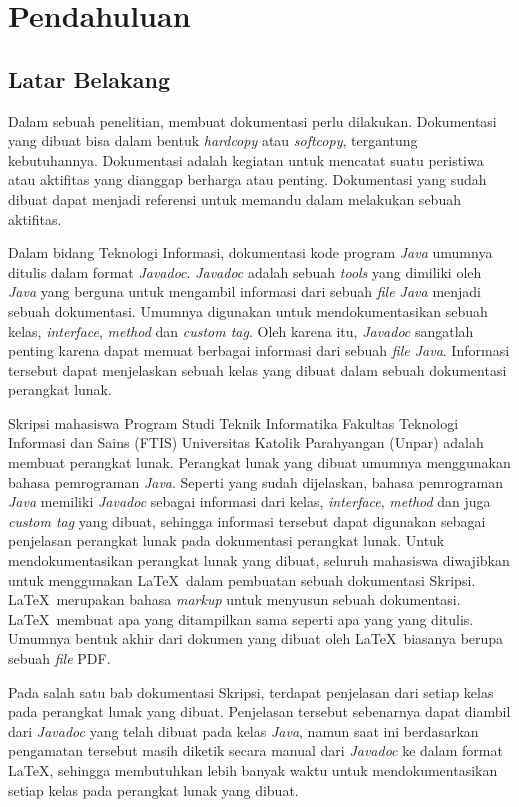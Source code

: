 \chapter{Pendahuluan}
\label{chap:intro}
   
\section{Latar Belakang}
\label{sec:label}

Dalam sebuah penelitian, membuat dokumentasi perlu dilakukan. Dokumentasi yang dibuat bisa dalam bentuk {\it hardcopy} atau {\it softcopy}, tergantung kebutuhannya. Dokumentasi adalah kegiatan untuk mencatat suatu peristiwa atau aktifitas yang dianggap berharga atau penting. Dokumentasi yang sudah dibuat dapat menjadi referensi untuk memandu dalam melakukan sebuah aktifitas.

Dalam bidang Teknologi Informasi, dokumentasi kode program {\it Java} umumnya ditulis dalam format {\it Javadoc}. {\it Javadoc} adalah sebuah {\it tools} yang dimiliki oleh {\it Java} yang berguna untuk mengambil informasi dari sebuah {\it file Java} menjadi sebuah dokumentasi. Umumnya digunakan untuk mendokumentasikan sebuah kelas, {\it interface}, {\it method} dan {\it custom tag}. Oleh karena itu, {\it Javadoc} sangatlah penting karena dapat memuat berbagai informasi dari sebuah {\it file Java}. Informasi tersebut dapat menjelaskan sebuah kelas yang dibuat dalam sebuah dokumentasi perangkat lunak. 

Skripsi mahasiswa Program Studi Teknik Informatika Fakultas Teknologi Informasi dan Sains (FTIS) Universitas Katolik Parahyangan (Unpar) adalah membuat perangkat lunak. Perangkat lunak yang dibuat umumnya menggunakan bahasa pemrograman {\it Java}. Seperti yang sudah dijelaskan, bahasa pemrograman {\it Java} memiliki {\it Javadoc} sebagai informasi dari kelas, {\it interface}, {\it method} dan juga {\it custom tag} yang dibuat, sehingga informasi tersebut dapat digunakan sebagai penjelasan perangkat lunak pada dokumentasi perangkat lunak. Untuk mendokumentasikan perangkat lunak yang dibuat, seluruh mahasiswa diwajibkan untuk menggunakan \LaTeX\ dalam pembuatan sebuah dokumentasi Skripsi. \LaTeX\ merupakan bahasa {\it markup} untuk menyusun sebuah dokumentasi. \LaTeX\ membuat apa yang ditampilkan sama seperti apa yang yang ditulis. Umumnya bentuk akhir dari dokumen yang dibuat oleh \LaTeX\ biasanya berupa sebuah {\it file} PDF.

Pada salah satu bab dokumentasi Skripsi, terdapat penjelasan dari setiap kelas pada perangkat lunak yang dibuat. Penjelasan tersebut sebenarnya dapat diambil dari {\it Javadoc} yang telah dibuat pada kelas {\it Java}, namun saat ini berdasarkan pengamatan tersebut masih diketik secara manual dari {\it Javadoc} ke dalam format \LaTeX, sehingga membutuhkan lebih banyak waktu untuk mendokumentasikan setiap kelas pada perangkat lunak yang dibuat.

